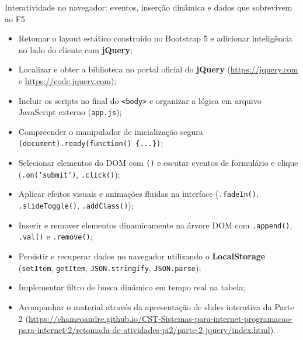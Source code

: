   {Interatividade no navegador: eventos, inserção dinâmica e dados que sobrevivem ao F5}
  {\hspace{4pt}
   \hspace{4pt}
   }

\vspace{0.4em}

\begin{boxObjetivos}
\begin{itemize}
\item Retomar o layout estático construído no Bootstrap 5 e adicionar inteligência no lado do cliente com \textbf{jQuery};
\item Localizar e obter a biblioteca no portal oficial do \textbf{jQuery} (\url{https://jquery.com} e \url{https://code.jquery.com});
\item Incluir os scripts no final do \texttt{<body>} e organizar a lógica em arquivo JavaScript externo (\texttt{app.js});
\item Compreender o manipulador de inicialização segura \texttt{\textdollar(document).ready(function() \{...\})};
\item Selecionar elementos do DOM com \texttt{\textdollar()} e escutar eventos de formulário e clique (\texttt{.on('submit')}, \texttt{.click()});
\item Aplicar efeitos visuais e animações fluidas na interface (\texttt{.fadeIn()}, \texttt{.slideToggle()}, \texttt{.addClass()});
\item Inserir e remover elementos dinamicamente na árvore DOM com \texttt{.append()}, \texttt{.val()} e \texttt{.remove()};
\item Persistir e recuperar dados no navegador utilizando o \textbf{LocalStorage} (\texttt{setItem}, \texttt{getItem}, \texttt{JSON.stringify}, \texttt{JSON.parse});
\item Implementar filtro de busca dinâmico em tempo real na tabela;
\item Acompanhar o material através da apresentação de slides interativa da Parte 2 (\url{https://chameoandre.github.io/CST-Sistemas-para-internet-programacao-para-internet-2/retomada-de-atividades-pi2/parte-2-jquery/index.html}).
\end{itemize}
\end{boxObjetivos}

